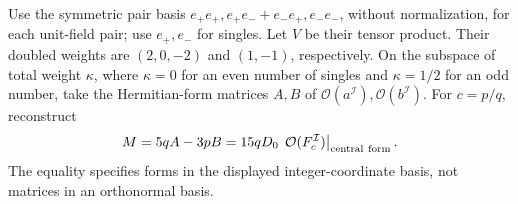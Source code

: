 \begin{htdef}
Use the symmetric pair basis
\(e_+e_+, e_+e_-+e_-e_+, e_-e_-\), without normalization, for each
unit-field pair; use \(e_+,e_-\) for singles. Let \(V\) be their tensor
product. Their doubled weights are \((2,0,-2)\) and \((1,-1)\),
respectively. On the subspace of total weight \(\kappa\), where
\(\kappa=0\) for an even number of singles and \(\kappa=1/2\) for an
odd number, take the Hermitian-form matrices \(A,B\) of
\(\mathcal O(a^{\mathcal I}),\mathcal O(b^{\mathcal I})\).
For \(c=p/q\), reconstruct
\begin{equation}\label{ht:matrix}
 M=5qA-3pB=15qD_0\,
       \left.\mathcal O(F_c^{\mathcal I})\right|_{\rm central\ form}.
\end{equation}
The equality specifies forms in the displayed integer-coordinate basis,
not matrices in an orthonormal basis.
\end{htdef}


